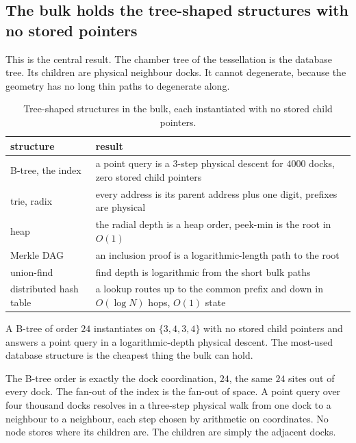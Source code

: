 \subsection{The bulk holds the tree-shaped structures with no stored pointers}

This is the central result. The chamber tree of the tessellation is the database tree. Its children are physical neighbour docks. It cannot degenerate, because the geometry has no long thin paths to degenerate along.

\begin{table}[ht]
\centering
\begin{tabular}{@{}ll@{}}
\toprule
structure & result \\
\midrule
B-tree, the index & a point query is a $3$-step physical descent for $4000$ docks, zero stored child pointers \\
trie, radix & every address is its parent address plus one digit, prefixes are physical \\
heap & the radial depth is a heap order, peek-min is the root in $O(1)$ \\
Merkle DAG & an inclusion proof is a logarithmic-length path to the root \\
union-find & find depth is logarithmic from the short bulk paths \\
distributed hash table & a lookup routes up to the common prefix and down in $O(\log N)$ hops, $O(1)$ state \\
\bottomrule
\end{tabular}
\caption{Tree-shaped structures in the bulk, each instantiated with no stored child pointers.}
\label{tab:tree-structures}
\end{table}

\begin{theorem}
A B-tree of order $24$ instantiates on $\{3,4,3,4\}$ with no stored child pointers and answers a point query in a logarithmic-depth physical descent. The most-used database structure is the cheapest thing the bulk can hold.
\end{theorem}

The B-tree order is exactly the dock coordination, $24$, the same $24$ sites out of every dock. The fan-out of the index is the fan-out of space. A point query over four thousand docks resolves in a three-step physical walk from one dock to a neighbour to a neighbour, each step chosen by arithmetic on coordinates. No node stores where its children are. The children are simply the adjacent docks.

